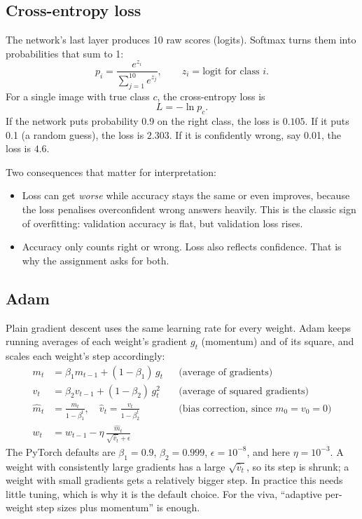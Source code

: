 \documentclass[11pt]{article}
\begin{document}
\subsection{Cross-entropy loss}

The network's last layer produces 10 raw scores (logits). Softmax turns them into probabilities that sum to 1:
\[
p_i = \frac{e^{z_i}}{\sum_{j=1}^{10} e^{z_j}}, \qquad z_i = \text{logit for class } i .
\]
For a single image with true class $c$, the cross-entropy loss is
\[
L = -\ln p_c .
\]
If the network puts probability 0.9 on the right class, the loss is $0.105$. If it puts 0.1 (a random guess), the loss is $2.303$. If it is confidently wrong, say 0.01, the loss is $4.6$.

Two consequences that matter for interpretation:
\begin{itemize}[noitemsep]
\item Loss can get \emph{worse} while accuracy stays the same or even improves, because the loss penalises overconfident wrong answers heavily. This is the classic sign of overfitting: validation accuracy is flat, but validation loss rises.
\item Accuracy only counts right or wrong. Loss also reflects confidence. That is why the assignment asks for both.
\end{itemize}

\subsection{Adam}

Plain gradient descent uses the same learning rate for every weight. Adam keeps running averages of each weight's gradient $g_t$ (momentum) and of its square, and scales each weight's step accordingly:
\begin{align*}
m_t &= \beta_1 m_{t-1} + (1-\beta_1)\,g_t && \text{(average of gradients)}\\
v_t &= \beta_2 v_{t-1} + (1-\beta_2)\,g_t^2 && \text{(average of squared gradients)}\\
\hat m_t &= \frac{m_t}{1-\beta_1^t}, \quad \hat v_t = \frac{v_t}{1-\beta_2^t} && \text{(bias correction, since } m_0=v_0=0)\\
w_t &= w_{t-1} - \eta\,\frac{\hat m_t}{\sqrt{\hat v_t}+\epsilon} &&
\end{align*}
The PyTorch defaults are $\beta_1=0.9$, $\beta_2=0.999$, $\epsilon=10^{-8}$, and here $\eta=10^{-3}$. A weight with consistently large gradients has a large $\sqrt{\hat v_t}$, so its step is shrunk; a weight with small gradients gets a relatively bigger step. In practice this needs little tuning, which is why it is the default choice. For the viva, ``adaptive per-weight step sizes plus momentum'' is enough.
\end{document}

